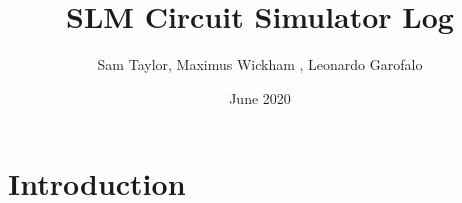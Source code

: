 \documentclass{article}
\title{SLM Circuit Simulator Log}
\author{Sam Taylor, Maximus Wickham , Leonardo Garofalo}
\date{June 2020}
\begin{document}
\maketitle

\section{Introduction}
\end{document}
